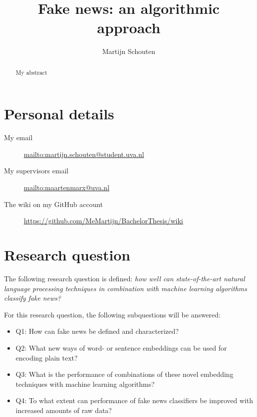 \documentclass[a4paper,pdf]{article} %
\begin{document}
\title{Fake news: an algorithmic approach} %
\author{Martijn Schouten}

\maketitle


\begin{abstract}
My abstract
\end{abstract}


\section{Personal details}

\begin{description}
 \item[My email] \url{mailto:martijn.schouten@student.uva.nl }
 \item[My supervisors email] \url{mailto:maartenmarx@uva.nl }
 \item[The wiki on my GitHub account] \url{https://github.com/MeMartijn/BachelorThesis/wiki}
 \end{description} 

\section{Research question}

The following research question is defined: \textit{how well can state-of-the-art natural language processing techniques in combination with machine learning algorithms classify fake news?}

For this research question, the following subquestions will be answered:
\begin{itemize}
  \item Q1: How can fake news be defined and characterized?
  \item Q2: What new ways of word- or sentence embeddings can be used for encoding plain text?
  \item Q3: What is the performance of combinations of these novel embedding techniques with machine learning algorithms?
  \item Q4: To what extent can performance of fake news classifiers be improved with increased amounts of raw data?
\end{itemize}
\end{document}
